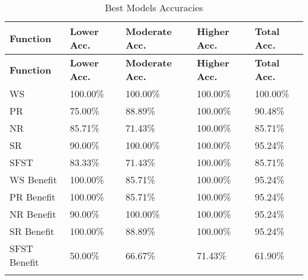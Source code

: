 \documentclass[12pt,letterpaper]{article}
\begin{document}
\begin{longtable}{|p{3cm}|p{3cm}|p{3cm}|p{3cm}|p{3cm}|}
\hline
\textbf{Function} & \textbf{Lower Acc.} & \textbf{Moderate Acc.} & \textbf{Higher Acc.} & \textbf{Total Acc.}  \\ \hline
\endfirsthead
\hline
\textbf{Function} & \textbf{Lower Acc.} & \textbf{Moderate Acc.} & \textbf{Higher Acc.} & \textbf{Total Acc.}  \\ \hline
\endhead

WS & 100.00\% & 100.00\% & 100.00\% & 100.00\% \\ \hline
PR & 75.00\% & 88.89\% & 100.00\% & 90.48\% \\ \hline
NR & 85.71\% & 71.43\% & 100.00\% & 85.71\% \\ \hline
SR & 90.00\% & 100.00\% & 100.00\% & 95.24\% \\ \hline
SFST & 83.33\% & 71.43\% & 100.00\% & 85.71\% \\ \hline

WS Benefit & 100.00\% & 85.71\% & 100.00\% & 95.24\% \\ \hline
PR Benefit & 100.00\% & 85.71\% & 100.00\% & 95.24\% \\ \hline
NR Benefit & 90.00\% & 100.00\% & 100.00\% & 95.24\% \\ \hline
SR Benefit & 100.00\% & 88.89\% & 100.00\% & 95.24\% \\ \hline
SFST Benefit & 50.00\% & 66.67\% & 71.43\% & 61.90\% \\ \hline

\caption{Best Models Accuracies}
\label{tab:grouping_1_reg_spec}
\end{longtable}
\end{document}
